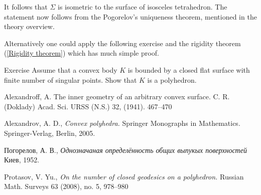 \documentclass[oneside,a4paper, 12pt]{article}
\begin{document}
It follows that $\Sigma$ is isometric to the surface of isosceles tetrahedron.
The statement now follows from the Pogorelov's uniqueness theorem,
mentioned in the theory overview.

Alternatively one could apply the following exercise and the rigidity theorem (\ref{Rigidity theorem}) which has much simple proof.
\qeds

\begin{thm}{Exercise}
Assume that a convex body $K$ is bounded by a closed flat surface with finite number of singular points.
Show that $K$ is a polyhedron.
\end{thm}

\begin{thebibliography}{52}
Alexandroff, A. 
The inner geometry of an arbitrary convex surface. C. R. (Doklady) 
Acad. Sci. URSS (N.S.) 
32, 
(1941). 
467--470

Alexandrov, A. D.,
\emph{Convex polyhedra.}
Springer Monographs in Mathematics. Springer-Verlag, Berlin, 2005.

\begin{otherlanguage}{russian}
Погорелов, А. В.,
\emph{Однозначаная определённость общих выпукых поверхностей}
Киев, 1952.
\end{otherlanguage}



 Protasov, V. Yu.,
\emph{On the number of closed geodesics on a polyhedron.}  Russian Math. Surveys 63 (2008), no. 5, 978--980
\end{thebibliography}
\end{document}
